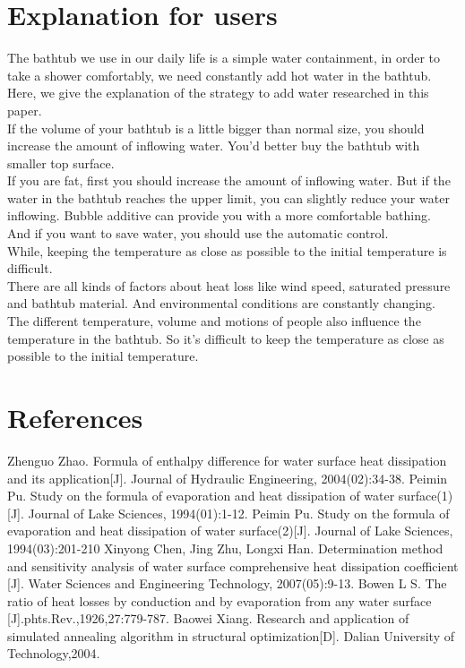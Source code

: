 \documentclass{mcmthesis}
\begin{document}
\section{Explanation for users}
\indent The bathtub we use in our daily life is a simple water containment, in order to take a shower comfortably, we need constantly add hot water in the bathtub.\\
\indent Here, we give the explanation of the strategy to add water researched in this paper.\\
\indent If the volume of your bathtub is a little bigger than normal size, you should increase the amount of inflowing water. You'd better buy the bathtub with smaller top surface. \\
\indent If you are fat, first you should increase the amount of inflowing water. But if the water in the bathtub reaches the upper limit, you can slightly reduce your water inflowing. Bubble additive can provide you with a more comfortable bathing. \\
\indent And if you want to save water, you should use the automatic control.\\
\indent While, keeping the temperature as close as possible to the initial temperature is difficult.\\
\indent There are all kinds of factors about heat loss like wind speed, saturated pressure and bathtub material. And environmental conditions are constantly changing. The different temperature, volume and motions of people also influence the temperature in the bathtub.  So it's difficult to keep the temperature as close as possible to the initial temperature.

\section{References}
\begin{thebibliography}{99}
Zhenguo Zhao. Formula of enthalpy difference for water surface heat dissipation and its application[J]. Journal of Hydraulic Engineering, 2004(02):34-38.
Peimin Pu. Study on the formula of evaporation and heat dissipation of water surface(1)[J]. Journal of Lake Sciences, 1994(01):1-12.
Peimin Pu. Study on the formula of evaporation and heat dissipation of water surface(2)[J]. Journal of Lake Sciences, 1994(03):201-210
Xinyong Chen, Jing Zhu, Longxi Han. Determination method and sensitivity analysis of water surface comprehensive heat dissipation coefficient [J]. Water Sciences and Engineering Technology, 2007(05):9-13.
Bowen L S. The ratio of heat losses by conduction and by evaporation from any water surface [J].phts.Rev.,1926,27:779-787.
 Baowei Xiang. Research and application of simulated annealing algorithm in structural optimization[D]. Dalian University of Technology,2004.
\end{thebibliography}
\end{document}
